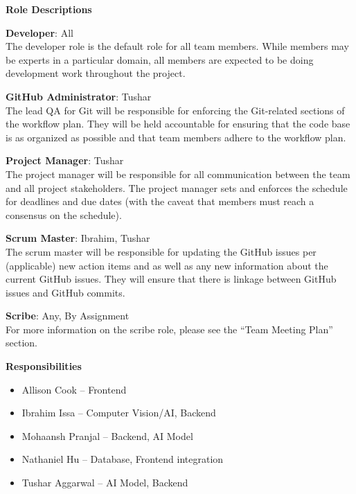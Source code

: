 \documentclass{article}
\begin{document}
\noindent \textbf{Role Descriptions}
\begin{itemize}
\begin{item} 
\textbf{Developer}: All \\
The developer role is the default role for all team members. While members may be experts in a particular domain, all members are expected to be doing development work throughout the project.
\end{item}
\begin{item}
\textbf{GitHub Administrator}: Tushar \\
The lead QA for Git will be responsible for enforcing the Git-related sections of the workflow plan. They will be held accountable for ensuring that the code base is as organized as possible and that team members adhere to the workflow plan.
\end{item}
\begin{item}
\textbf{Project Manager}: Tushar \\
The project manager will be responsible for all communication between the team and all project stakeholders. The project manager sets and enforces the schedule for deadlines and due dates (with the caveat that members must reach a consensus on the schedule).
\end{item}
\begin{item}
\textbf{Scrum Master}: Ibrahim, Tushar \\
The scrum master will be responsible for updating the GitHub issues per (applicable) new action items and as well as any new information about the current GitHub issues. They will ensure that there is linkage between GitHub issues and GitHub commits. 
\end{item}
\begin{item} 
\textbf{Scribe}: Any, By Assignment \\
For more information on the scribe role, please see the ``Team Meeting Plan'' section.
\end{item}
\end{itemize}

\noindent \textbf{Responsibilities}
\begin{itemize}
\item Allison Cook – Frontend 
\item Ibrahim Issa – Computer Vision/AI, Backend
\item Mohaansh Pranjal – Backend, AI Model 
\item Nathaniel Hu – Database, Frontend integration
\item Tushar Aggarwal – AI Model, Backend
\end{itemize}
\end{document}
